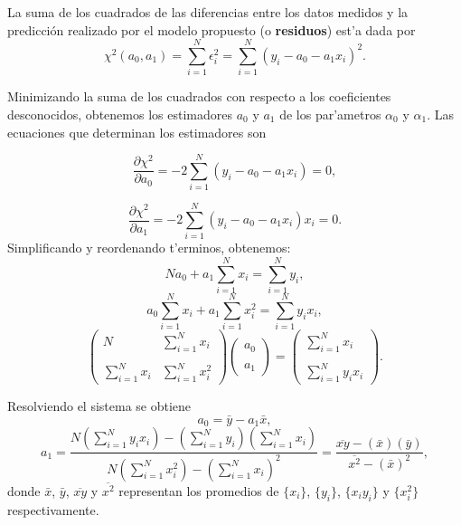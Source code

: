 \documentclass[letterpaper,11pt]{report}
\begin{document}
La suma de los cuadrados de las diferencias entre los datos medidos y la predicción realizado por el modelo propuesto (o \textbf{residuos}) est'a dada por
\begin{equation}
\chi^2(a_0,a_1)= \sum_{i=1}^N\epsilon_{i}^{2}= \sum_{i=1}^N (y_{i} - a_0 - a_1 x_{i})^{2}.
\end{equation}

Minimizando la suma de los cuadrados con respecto a los coeficientes desconocidos, obtenemos los estimadores $a_0$ y $a_1$ de los par'ametros $\alpha_0$ y $\alpha_1$. Las ecuaciones que determinan los estimadores son

\begin{equation}\label{dchi2db0}
\frac{\partial \chi^2}{\partial a_0}=-2 \sum_{i=1}^N (y_{i} - a_0 - a_1 x_{i})=0,
\end{equation}

\begin{equation}
\frac{\partial \chi^2}{\partial a_1}=-2 \sum_{i=1}^N (y_{i} - a_0 - a_1 x_{i})x_i=0.
\end{equation}
Simplificando y reordenando t'erminos, obtenemos:
\begin{equation}
N a_0 + a_1\sum_{i=1}^N x_{i}=\sum_{i=1}^N y_{i},
\end{equation}
\begin{equation}
a_0\sum_{i=1}^N x_{i}  + a_1\sum_{i=1}^N x_{i}^{2}=\sum_{i=1}^N y_{i}x_{i},
\end{equation}
\begin{equation}
\left( \begin{array} {cc}
N&\sum_{i=1}^N x_{i} \\  \\
\sum_{i=1}^N x_{i}&\sum_{i=1}^N x_{i}^{2} 
 \end{array}\right) \left( \begin{array} {c}
 a_0 \\  \\
 a_1 
  \end{array}\right)=\left( \begin{array} {c}
   \sum_{i=1}^N x_{i} \\  \\
   \sum_{i=1}^N y_{i}x_{i} 
    \end{array}\right).
\end{equation}

Resolviendo el sistema se obtiene
\begin{equation}
a_0 = \bar{y}-a_1 \bar{x},
\end{equation}
\begin{equation}
a_1 =  \frac{N\left(\sum_{i=1}^N y_{i}x_{i}\right)-\left(\sum_{i=1}^N y_{i}\right)\left(\sum_{i=1}^N x_{i}\right) }{N\left(\sum_{i=1}^N x_{i}^{2}\right)- \left(\sum_{i=1}^N x_{i}\right)^{2}}=\frac{\overline{xy}-(\bar{x})(\bar{y})}{\overline{x^2}-(\bar{x})^2},
\end{equation}
donde $\bar{x}$, $\bar{y}$, $\overline{xy}$ y $\overline{x^2}$ representan los promedios de $\{x_i\}$, $\{ y_i\}$, $\{x_iy_i\}$ y $\{x_i^2\}$ respectivamente. 
\end{document}
